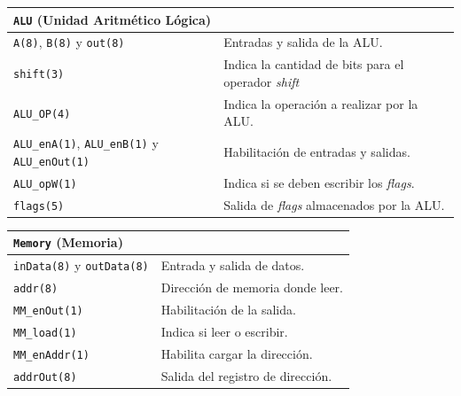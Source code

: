 \documentclass[a4paper,11pt]{article}
\begin{document}
\begin{center}
\begin{tabular}{p{6.4cm}|p{8.2cm}}
\multicolumn{2}{l}{ \texttt{ALU} (Unidad Aritmético Lógica) }\\ %
\hline
\texttt{A(8)}, \texttt{B(8)} y \texttt{out(8)}                      & Entradas y salida de la ALU.\\
\texttt{shift(3)}                                                   & Indica la cantidad de bits para el operador \emph{shift}\\
\texttt{ALU\_OP(4)}                                                 & Indica la operación a realizar por la ALU.\\
\texttt{ALU\_enA(1)}, \texttt{ALU\_enB(1)} y \texttt{ALU\_enOut(1)} & Habilitación de entradas y salidas. \\
\texttt{ALU\_opW(1)}                                                & Indica si se deben escribir los \emph{flags}.\\
\texttt{flags(5)}                                                   & Salida de \emph{flags} almacenados por la ALU.\\
\end{tabular}
\end{center}

\begin{center}
\begin{tabular}{p{6.4cm}|p{8.2cm}}
\multicolumn{2}{l}{ \texttt{Memory} (Memoria) }\\ %
\hline                                      
\texttt{inData(8)} y \texttt{outData(8)}    & Entrada y salida de datos.\\
\texttt{addr(8)}                            & Dirección de memoria donde leer.\\
\texttt{MM\_enOut(1)}                       & Habilitación de la salida.\\
\texttt{MM\_load(1)}                        & Indica si leer o escribir. \\
\texttt{MM\_enAddr(1)}                      & Habilita cargar la dirección. \\
\texttt{addrOut(8)}                         & Salida del registro de dirección. \\
\end{tabular}
\end{center}
\end{document}
